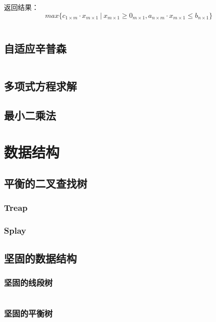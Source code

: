 \documentclass[a4paper]{article}
\newcommand{\cppcode}[1]{
    \inputminted[mathescape]{cpp}{source/#1}
}
\begin{document}
返回结果：$$max\{c_{1 \times m} \cdot x_{m \times 1} \ | \ x_{m \times 1} \geq 0_{m \times 1}, a_{n \times m} \cdot x_{m \times 1} \leq b_{n \times 1}\}$$

\cppcode{numerical-algorithm/linear-programming-simplex.cpp}

\subsection{自适应辛普森}

\cppcode{numerical-algorithm/adaptive-simpson.cpp}

\subsection{多项式方程求解}

\subsection{最小二乘法}

\section{数据结构}

\subsection{平衡的二叉查找树}

\subsubsection{Treap}


\subsubsection{Splay}

\subsection{坚固的数据结构}

\subsubsection{坚固的线段树}

\cppcode{data-structure/persistent-segment-tree.cpp}

\subsubsection{坚固的平衡树}
\end{document}
